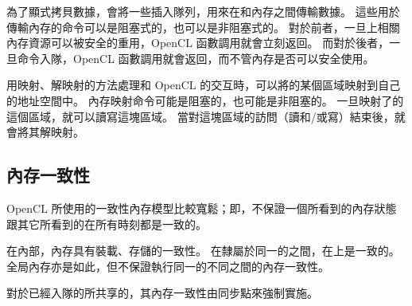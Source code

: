 為了顯式拷貝數據，會將一些插入隊列，用來在和內存之間傳輸數據。
這些用於傳輸內存的命令可以是阻塞式的，也可以是非阻塞式的。
對於前者，一旦上相關內存資源可以被安全的重用，OpenCL 函數調用就會立刻返回。
而對於後者，一旦命令入隊，OpenCL 函數調用就會返回，而不管內存是否可以安全使用。

用映射、解映射的方法處理和 OpenCL 的交互時，可以將的某個區域映射到自己的地址空間中。
內存映射命令可能是阻塞的，也可能是非阻塞的。
一旦映射了的這個區域，就可以讀寫這塊區域。
當對這塊區域的訪問（讀和/或寫）結束後，就會將其解映射。

\subsection{內存一致性}
OpenCL 所使用的一致性內存模型比較寬鬆；即，不保證一個所看到的內存狀態跟其它所看到的在所有時刻都是一致的。

在內部，內存具有裝載、存儲的一致性。
在隸屬於同一的之間，在上是一致的。
全局內存亦是如此，但不保證執行同一的不同之間的內存一致性。

對於已經入隊的所共享的，其內存一致性由同步點來強制實施。

